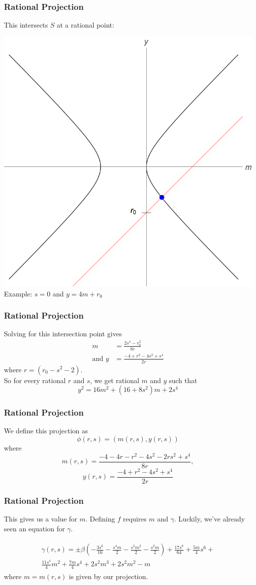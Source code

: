 \begin{frame}
	\frametitle{Rational Projection}
	This intersects $S$ at a rational point:
	\begin{center}
		\includegraphics[width=.6\textwidth]{s0ProjectionIntersectionPlot.png} \\
		Example: $s=0$ and $y=4m+r_0$
	\end{center}
\end{frame}

\begin{frame}
	\frametitle{Rational Projection}
	Solving for this intersection point gives
	\begin{align*}
		m &= \frac{2 s^4-r_0^2}{8 r} \\
		\mbox{and }y &= \frac{-4 + r^2 - 4 s^2 + s^4}{2 r}
	\end{align*}
	$\mbox{where }r=\left(r_0-s^2-2\right).$\\
	\pause
	So for every rational $r$ and $s$, we get rational $m$ and $y$ such that
	$$ y^2 = 16m^2 + (16+8s^2)m + 2s^4 $$
\end{frame}

\begin{frame}
	\frametitle{Rational Projection}
	\begin{defn}
		We define this projection as $$ \phi(r,s) = (m(r,s),y(r,s)) $$ where $$m(r,s)=\frac{-4 - 4 r - r^2 - 4 s^2 - 2 r s^2 + s^4}{8r},$$ $$y(r,s)=\frac{-4 + r^2 - 4 s^2 + s^4}{2 r}  $$
	\end{defn}
\end{frame}

\begin{frame}
	\frametitle{Rational Projection}
	This gives us a value for $m$. Defining $f$ requires $m$ and $\gamma$. Luckily, we've already seen an equation for $\gamma$.
	\pause
	\begin{defn}
		\begin{align*}
			\begin{split}
				\gamma(r,s) = \pm\beta \left(- \frac{3 s^{6}}{16} - \frac{s^{4} m}{2} - \frac{s^{2} m^{2}}{2} - \frac{s^{2} m}{2}\right) + \frac{17 s^{8}}{64} + \frac{5 m}{4} s^{6} + \\ \frac{11 s^{4}}{4} m^{2} + \frac{7 m}{4} s^{4} + 2 s^{2} m^{3} + 2 s^{2} m^{2} - m
			\end{split}
		\end{align*}
	where $m=m(r,s)$ is given by our projection.
	\end{defn}
\end{frame}

